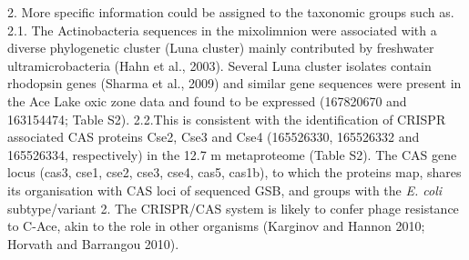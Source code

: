 2. More specific information could be assigned to the taxonomic groups such as.
2.1. The Actinobacteria sequences in the mixolimnion were associated with a diverse phylogenetic cluster (Luna cluster) mainly contributed by freshwater ultramicrobacteria (Hahn et al., 2003). 
Several Luna cluster isolates contain rhodopsin genes (Sharma et al., 2009) and similar gene sequences were present in the Ace Lake oxic zone data and found to be expressed (167820670 and 163154474; Table S2).
2.2.This is consistent with the identification of \ac{CRISPR} associated \ac{CAS} proteins Cse2, Cse3 and Cse4 (165526330, 165526332 and 165526334, respectively) in the 12.7 m metaproteome (Table S2). 
The \ac{CAS} gene locus (cas3, cse1, cse2, cse3, cse4, cas5, cas1b), to which the proteins map, shares its organisation with \ac{CAS} loci of sequenced \ac{GSB}, and groups with the \emph{E. coli} subtype/variant 2. The \ac{CRISPR}/\ac{CAS} system is likely to confer phage resistance to C-Ace, akin to the role in other organisms (Karginov and Hannon 2010; Horvath and Barrangou 2010).

